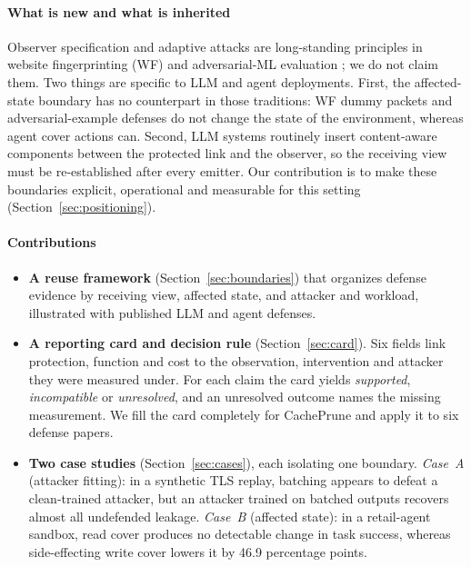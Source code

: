 \paragraph{What is new and what is inherited}
Observer specification and adaptive attacks are long-standing principles in website fingerprinting (WF) and adversarial-ML evaluation \cite{juarez2014critical,mathews2023critical,carlini2019evaluating,tramer2020adaptive}; we do not claim them. Two things are specific to LLM and agent deployments. First, the affected-state boundary has no counterpart in those traditions: WF dummy packets and adversarial-example defenses do not change the state of the environment, whereas agent cover actions can. Second, LLM systems routinely insert content-aware components between the protected link and the observer, so the receiving view must be re-established after every emitter. Our contribution is to make these boundaries explicit, operational and measurable for this setting (Section~\ref{sec:positioning}).

\paragraph{Contributions}
\begin{itemize}
\item \textbf{A reuse framework} (Section~\ref{sec:boundaries}) that organizes defense evidence by receiving view, affected state, and attacker and workload, illustrated with published LLM and agent defenses.
\item \textbf{A reporting card and decision rule} (Section~\ref{sec:card}). Six fields link protection, function and cost to the observation, intervention and attacker they were measured under. For each claim the card yields \emph{supported}, \emph{incompatible} or \emph{unresolved}, and an unresolved outcome names the missing measurement. We fill the card completely for CachePrune \cite{wu2026cacheprune} and apply it to six defense papers.
\item \textbf{Two case studies} (Section~\ref{sec:cases}), each isolating one boundary. \emph{Case~A} (attacker fitting): in a synthetic TLS replay, batching appears to defeat a clean-trained attacker, but an attacker trained on batched outputs recovers almost all undefended leakage. \emph{Case~B} (affected state): in a retail-agent sandbox, read cover produces no detectable change in task success, whereas side-effecting write cover lowers it by 46.9 percentage points.
\end{itemize}

